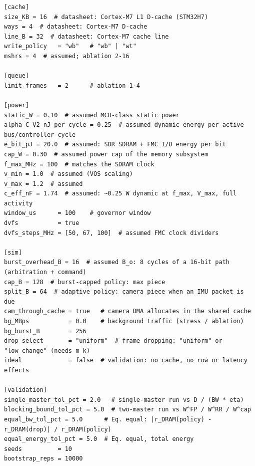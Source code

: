 {\begin{verbatim}
[cache]
size_KB = 16  # datasheet: Cortex-M7 L1 D-cache (STM32H7)
ways = 4  # datasheet: Cortex-M7 D-cache
line_B = 32  # datasheet: Cortex-M7 cache line
write_policy   = "wb"   # "wb" | "wt"
mshrs = 4  # assumed; ablation 2-16

[queue]
limit_frames   = 2      # ablation 1-4

[power]
static_W = 0.10  # assumed MCU-class static power
alpha_C_V2_nJ_per_cycle = 0.25  # assumed dynamic energy per active bus/controller cycle
e_bit_pJ = 20.0  # assumed: SDR SDRAM + FMC I/O energy per bit
cap_W = 0.30  # assumed power cap of the memory subsystem
f_max_MHz = 100  # matches the SDRAM clock
v_min = 1.0  # assumed (VOS scaling)
v_max = 1.2  # assumed
c_eff_nF = 1.74  # assumed: ~0.25 W dynamic at f_max, V_max, full activity
window_us      = 100    # governor window
dvfs           = true
dvfs_steps_MHz = [50, 67, 100]  # assumed FMC clock dividers

[sim]
burst_overhead_B = 16  # assumed B_o: 8 cycles of a 16-bit path (arbitration + command)
cap_B = 128  # burst-capped policy: max piece
split_B = 64  # adaptive policy: camera piece when an IMU packet is due
cam_through_cache = true   # camera DMA allocates in the shared cache
bg_MBps           = 0.0    # background traffic (stress / ablation)
bg_burst_B        = 256
drop_select       = "uniform"  # frame dropping: "uniform" or "low_change" (needs m_k)
ideal             = false  # validation: no cache, no row or latency effects

[validation]
single_master_tol_pct = 2.0   # single-master run vs D / (BW * eta)
blocking_bound_tol_pct = 5.0  # two-master run vs W^FP / W^RR / W^cap
equal_bw_tol_pct = 5.0      # Eq. equal: |r_DRAM(policy) - r_DRAM(drop)| / r_DRAM(policy)
equal_energy_tol_pct = 5.0  # Eq. equal, total energy
seeds          = 10
bootstrap_reps = 10000

\end{verbatim}
}
